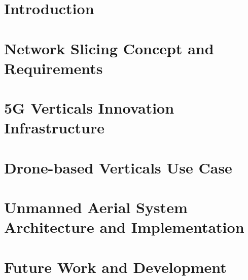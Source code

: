 \documentclass[12pt,vi,twoside]{mitthesis}
\begin{document}

% 
\pagestyle{plain}




\chapter{Introduction}


\chapter{Network Slicing Concept and Requirements}


\chapter{5G Verticals Innovation Infrastructure}


\chapter{Drone-based Verticals Use Case}


\chapter{Unmanned Aerial System Architecture and Implementation}


\chapter{Future Work and Development}


%
%
\printnoidxglossary[type=\acronymtype]


\end{document}
